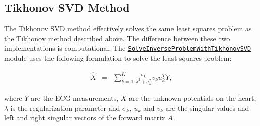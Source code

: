     
\subsection{Tikhonov SVD Method}
    The Tikhonov SVD method effectively solves the same least squares problem as the Tikhonov method described above.
    The difference between these two implementations is computational. 
    The \href{http://scirundocwiki.sci.utah.edu/SCIRunDocs/index.php5/CIBC:Documentation:SCIRun:Reference:BioPSE:SolveInverseProblemWithTikhonovSVD}{{\tt SolveInverseProblemWithTikhonovSVD}} module uses the following formulation to solve the least-squares problem:
    \begin{center}
    \begin{eqnarray}
        \hat{X}   &=& \sum_{k=1}^K \frac{\sigma_k}{\lambda^2 + \sigma_k^2} v_k u_k^T Y,
    \label{eq:inverseSec_TikhonovSolutions1}
    \end{eqnarray}
    \end{center} 
    where $Y$ are the ECG measurements, $X$ are the unknown potentials on the heart, $\lambda$ is the regularization parameter and $\sigma_k$, $u_k$ and $v_k$ are the singular values and left and right singular vectors of the forward matrix $A$.
    

